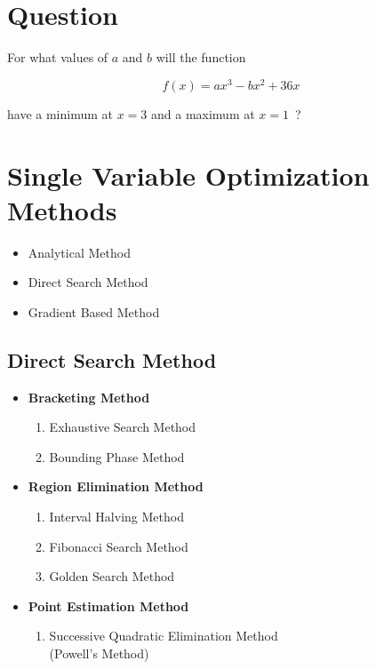 \documentclass{article}
\begin{document}
\section*{Question}

For what values of \(a\) and \(b\) will the function

\[
f(x)=ax^3-bx^2+36x
\]

have a minimum at \(x=3\) and a maximum at \(x=1\,\) ?

\vspace{0.5cm}
\hrulefill
\vspace{0.5cm}



\section*{Single Variable Optimization Methods}

\begin{itemize}
    \item Analytical Method
    \item Direct Search Method
    \item Gradient Based Method
\end{itemize}

\subsection*{Direct Search Method}

\begin{itemize}
    \item \textbf{Bracketing Method}
    \begin{enumerate}
        \item Exhaustive Search Method
        \item Bounding Phase Method
    \end{enumerate}

    \item \textbf{Region Elimination Method}
    \begin{enumerate}
        \item Interval Halving Method
        \item Fibonacci Search Method
        \item Golden Search Method
    \end{enumerate}

    \item \textbf{Point Estimation Method}
    \begin{enumerate}
        \item Successive Quadratic Elimination Method\\
        (Powell's Method)
    \end{enumerate}
\end{itemize}
\end{document}
